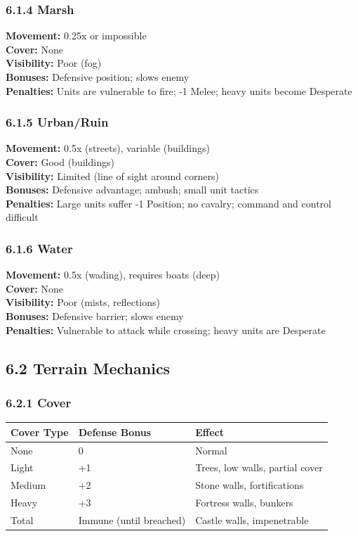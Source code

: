 \documentclass[11pt]{article}
\begin{document}
\subsubsection{6.1.4 Marsh}

\textbf{Movement:} 0.25x or impossible\\
\textbf{Cover:} None\\
\textbf{Visibility:} Poor (fog)\\
\textbf{Bonuses:} Defensive position; slows enemy\\
\textbf{Penalties:} Units are vulnerable to fire; -1 Melee; heavy units become Desperate

\subsubsection{6.1.5 Urban/Ruin}

\textbf{Movement:} 0.5x (streets), variable (buildings)\\
\textbf{Cover:} Good (buildings)\\
\textbf{Visibility:} Limited (line of sight around corners)\\
\textbf{Bonuses:} Defensive advantage; ambush; small unit tactics\\
\textbf{Penalties:} Large units suffer -1 Position; no cavalry; command and control difficult

\subsubsection{6.1.6 Water}

\textbf{Movement:} 0.5x (wading), requires boats (deep)\\
\textbf{Cover:} None\\
\textbf{Visibility:} Poor (mists, reflections)\\
\textbf{Bonuses:} Defensive barrier; slows enemy\\
\textbf{Penalties:} Vulnerable to attack while crossing; heavy units are Desperate

\subsection{6.2 Terrain Mechanics}

\subsubsection{6.2.1 Cover}

\begin{tabular}{|l|l|l|}
\hline
Cover Type & Defense Bonus & Effect \\
\hline
None & 0 & Normal \\
\hline
Light & +1 & Trees, low walls, partial cover \\
\hline
Medium & +2 & Stone walls, fortifications \\
\hline
Heavy & +3 & Fortress walls, bunkers \\
\hline
Total & Immune (until breached) & Castle walls, impenetrable \\
\hline
\end{tabular}
\end{document}
